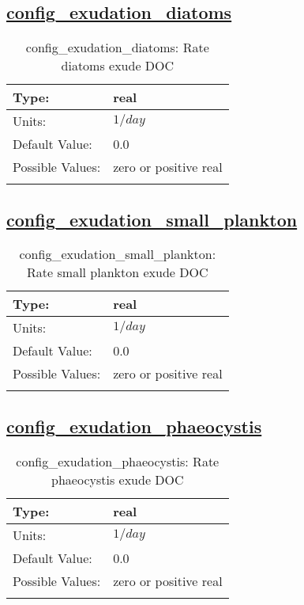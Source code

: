 \subsection[config\_exudation\_diatoms]{\hyperref[sec:nm_tab_biogeochemistry]{config\_exudation\_diatoms}}
\label{subsec:nm_sec_config_exudation_diatoms}
\begin{center}
\begin{longtable}{| p{2.0in} || p{4.0in} |}
    \hline
    Type: & real \\
    \hline
    Units: & $1/day$ \\
    \hline
    Default Value: & 0.0 \\
    \hline
    Possible Values: & zero or positive real \\
    \hline
    \caption{config\_exudation\_diatoms: Rate diatoms exude DOC}
\end{longtable}
\end{center}
\subsection[config\_exudation\_small\_plankton]{\hyperref[sec:nm_tab_biogeochemistry]{config\_exudation\_small\_plankton}}
\label{subsec:nm_sec_config_exudation_small_plankton}
\begin{center}
\begin{longtable}{| p{2.0in} || p{4.0in} |}
    \hline
    Type: & real \\
    \hline
    Units: & $1/day$ \\
    \hline
    Default Value: & 0.0 \\
    \hline
    Possible Values: & zero or positive real \\
    \hline
    \caption{config\_exudation\_small\_plankton: Rate small plankton exude DOC}
\end{longtable}
\end{center}
\subsection[config\_exudation\_phaeocystis]{\hyperref[sec:nm_tab_biogeochemistry]{config\_exudation\_phaeocystis}}
\label{subsec:nm_sec_config_exudation_phaeocystis}
\begin{center}
\begin{longtable}{| p{2.0in} || p{4.0in} |}
    \hline
    Type: & real \\
    \hline
    Units: & $1/day$ \\
    \hline
    Default Value: & 0.0 \\
    \hline
    Possible Values: & zero or positive real \\
    \hline
    \caption{config\_exudation\_phaeocystis: Rate phaeocystis exude DOC}
\end{longtable}
\end{center}
